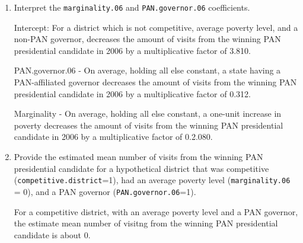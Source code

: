 \documentclass[12pt,letterpaper]{article}
\begin{document}
\begin{enumerate}
	\item [(b)]
	Interpret the \texttt{marginality.06} and \texttt{PAN.governor.06} coefficients.
	
	Intercept: For a district which is not competitive, average poverty level, and a non-PAN governor, decreases the amount of visits from the winning PAN presidential candidate in 2006 by a multiplicative factor of 3.810.
	
	PAN.governor.06 - On average, holding all else constant, a state having a PAN-affiliated governor decreases the amount of visits from the winning PAN presidential candidate in 2006 by a multiplicative factor of 0.312. 

Marginality - On average, holding all else constant, a one-unit increase in poverty decreases the amount of visits from the winning PAN presidential candidate in 2006 by a multiplicative factor of 0.2.080. 


		
	\vspace{0.5cm}
	\item [(c)]
	Provide the estimated mean number of visits from the winning PAN presidential candidate for a hypothetical district that was competitive (\texttt{competitive.district}=1), had an average poverty level (\texttt{marginality.06} = 0), and a PAN governor (\texttt{PAN.governor.06}=1).
	
	For a competitive district, with an average poverty level and a PAN governor, the estimate mean number of visitng from the winning PAN presidential candidate is about 0. 
		
\end{enumerate}
\end{document}
